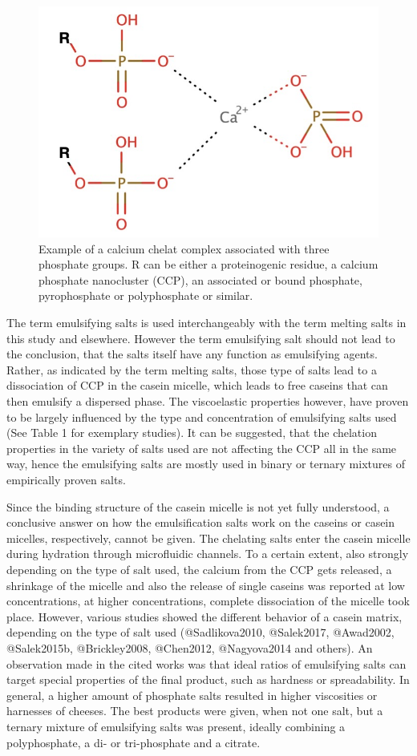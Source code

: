 \documentclass[
]{article}
\begin{document}
\begin{figure}
\includegraphics[width=0.3\linewidth]{images/Ca_chelat} \caption{Example of a calcium chelat complex associated with three phosphate groups. R can be either a proteinogenic residue, a calcium phosphate nanocluster (CCP), an associated or bound phosphate, pyrophosphate or polyphosphate or similar.}\label{fig:chel}
\end{figure}

The term emulsifying salts is used interchangeably with the term melting
salts in this study and elsewhere. However the term emulsifying salt
should not lead to the conclusion, that the salts itself have any
function as emulsifying agents. Rather, as indicated by the term melting
salts, those type of salts lead to a dissociation of CCP in the casein
micelle, which leads to free caseins that can then emulsify a dispersed
phase. The viscoelastic properties however, have proven to be largely
influenced by the type and concentration of emulsifying salts used (See
Table 1 for exemplary studies). It can be suggested, that the chelation
properties in the variety of salts used are not affecting the CCP all in
the same way, hence the emulsifying salts are mostly used in binary or
ternary mixtures of empirically proven salts.

Since the binding structure of the casein micelle is not yet fully
understood, a conclusive answer on how the emulsification salts work on
the caseins or casein micelles, respectively, cannot be given. The
chelating salts enter the casein micelle during hydration through
microfluidic channels. To a certain extent, also strongly depending on
the type of salt used, the calcium from the CCP gets released, a
shrinkage of the micelle and also the release of single caseins was
reported at low concentrations, at higher concentrations, complete
dissociation of the micelle took place. However, various studies showed
the different behavior of a casein matrix, depending on the type of salt
used (@Sadlikova2010, @Salek2017, @Awad2002, @Salek2015b, @Brickley2008,
@Chen2012, @Nagyova2014 and others). An observation made in the cited
works was that ideal ratios of emulsifying salts can target special
properties of the final product, such as hardness or spreadability. In
general, a higher amount of phosphate salts resulted in higher
viscosities or harnesses of cheeses. The best products were given, when
not one salt, but a ternary mixture of emulsifying salts was present,
ideally combining a polyphosphate, a di- or tri-phosphate and a citrate.
\end{document}
